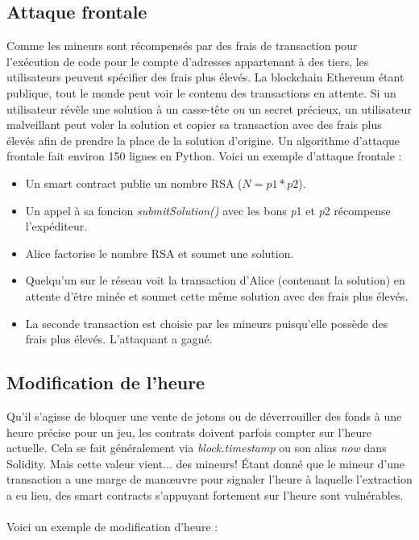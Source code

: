 \documentclass[12pt, a4paper, oneside]{book}
\begin{document}
    \subsection{Attaque frontale}

    Comme les mineurs sont récompensés par des frais de transaction pour l'exécution de code pour le compte d'adresses appartenant à des tiers, les utilisateurs peuvent spécifier des frais plus élevés. La blockchain Ethereum étant publique, tout le monde peut voir le contenu des transactions en attente. Si un utilisateur révèle une solution à un casse-tête ou un secret précieux, un utilisateur malveillant peut voler la solution et copier sa transaction avec des frais plus élevés afin de prendre la place de la solution d'origine. Un algorithme d'attaque frontale fait environ 150 lignes en Python.
    \newpage
    Voici un exemple d'attaque frontale :

    \begin{itemize}
        \item Un smart contract publie un nombre RSA ($N = p1 * p2$).
        \item Un appel à sa foncion \emph{submitSolution()} avec les bons \emph{p}1 et \emph{p}2 récompense l'expéditeur.
        \item Alice factorise le nombre RSA et soumet une solution.
        \item Quelqu'un sur le réseau voit la transaction d'Alice (contenant la solution) en attente d'être minée et soumet cette même solution avec des frais plus élevés.
        \item La seconde transaction est choisie par les mineurs puisqu'elle possède des frais plus élevés. L'attaquant a gagné.
    \end{itemize}

    \subsection{Modification de l'heure}

    Qu'il s'agisse de bloquer une vente de jetons ou de déverrouiller des fonds à une heure précise pour un jeu, les contrats doivent parfois compter sur l'heure actuelle. Cela se fait généralement via \emph{block.timestamp} ou son alias \emph{now} dans Solidity. Mais cette valeur vient... des mineurs! Étant donné que le mineur d'une transaction a une marge de manœuvre pour signaler l'heure à laquelle l'extraction a eu lieu, des smart contracts s'appuyant fortement sur l'heure sont vulnérables.
    \\
    \\
    Voici un exemple de modification d'heure :
\end{document}
